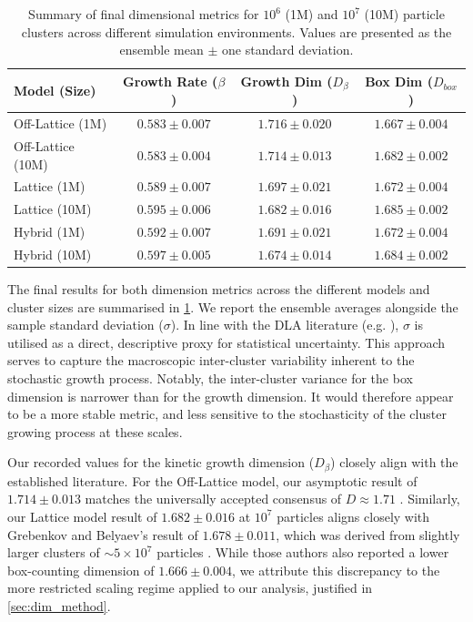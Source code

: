 \documentclass[12pt, a4paper, oneside]{report}
\theoremstyle{remark}
\begin{document}
\begin{table}[htbp]
    \centering
    \caption{Summary of final dimensional metrics for $10^6$ (1M) and $10^7$ (10M) particle clusters across different simulation environments. Values are presented as the ensemble mean $\pm$ one standard deviation.}
    \label{tab:dim_results}
    \begin{tabular}{lccc}
        \toprule
        \textbf{Model (Size)} & \textbf{Growth Rate ($\beta$)} & \textbf{Growth Dim ($D_\beta$)} & \textbf{Box Dim ($D_{box}$)} \\
        \midrule
        Off-Lattice (1M) & $0.583 \pm 0.007$ & $1.716 \pm 0.020$ & $1.667 \pm 0.004$ \\
        Off-Lattice (10M)& $0.583 \pm 0.004$ & $1.714 \pm 0.013$ & $1.682 \pm 0.002$ \\
        \midrule
        Lattice (1M)     & $0.589 \pm 0.007$ & $1.697 \pm 0.021$ & $1.672 \pm 0.004$ \\
        Lattice (10M)    & $0.595 \pm 0.006$ & $1.682 \pm 0.016$ & $1.685 \pm 0.002$ \\
        \midrule
        Hybrid (1M)      & $0.592 \pm 0.007$ & $1.691 \pm 0.021$ & $1.672 \pm 0.004$ \\
        Hybrid (10M)     & $0.597 \pm 0.005$ & $1.674 \pm 0.014$ & $1.684 \pm 0.002$ \\
        \bottomrule
    \end{tabular}
\end{table}

The final results for both dimension metrics across the different models and cluster sizes are summarised in \cref{tab:dim_results}. We report the ensemble averages alongside the sample standard deviation ($\sigma$). In line with the DLA literature (e.g. \cite{Grebenkov2017}), $\sigma$ is utilised as a direct, descriptive proxy for statistical uncertainty. This approach serves to capture the macroscopic inter-cluster variability inherent to the stochastic growth process.  
Notably, the inter-cluster variance for the box dimension is narrower than for the growth dimension. It would therefore appear to be a more stable metric, and less sensitive to the stochasticity of the cluster growing process at these scales.

Our recorded values for the kinetic growth dimension ($D_\beta$) closely align with the established literature. For the Off-Lattice model, our asymptotic result of $1.714 \pm 0.013$ matches the universally accepted consensus of $D \approx 1.71$ \cite{ossadnik1991}. Similarly, our Lattice model result of $1.682 \pm 0.016$ at $10^7$ particles aligns closely with Grebenkov and Belyaev's result of $1.678 \pm 0.011$, which was derived from slightly larger clusters of $\sim 5 \times 10^7$ particles \cite{Grebenkov2017}. While those authors also reported a lower box-counting dimension of $1.666 \pm 0.004$, we attribute this discrepancy to the more restricted scaling regime applied to our analysis, justified in \cref{sec:dim_method}.
\end{document}
